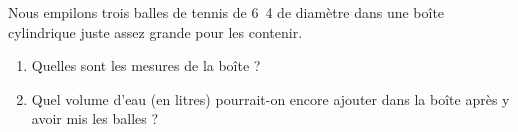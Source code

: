 
\begin{exercice}\label{exosmath-0113}

    Nous empilons trois balles de tennis de \unit{6.4}{\centi\meter} de diamètre dans une boîte cylindrique juste assez grande pour les contenir.
    \begin{enumerate}
        \item
            Quelles sont les mesures de la boîte ?
        \item
            Quel volume d'eau (en litres) pourrait-on encore ajouter dans la boîte après y avoir mis les balles ?
    \end{enumerate}

\end{exercice}

